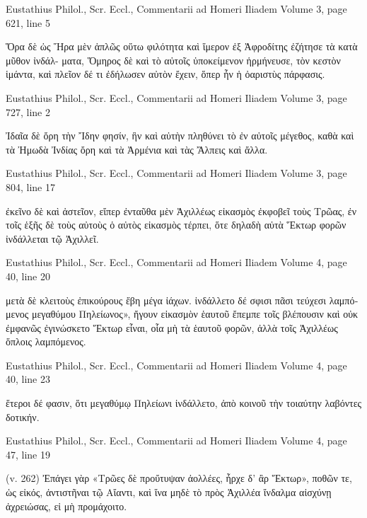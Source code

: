 \documentclass[12pt,letterpaper,twoside,final]{memoir}
\begin{document}
\begin{greek}
Eustathius Philol., Scr. Eccl., Commentarii ad Homeri Iliadem 
Volume 3, page 621, line 5

                                                            Ὅρα δὲ ὡς Ἥρα μὲν 
ἁπλῶς οὕτω φιλότητα καὶ ἵμερον ἐξ Ἀφροδίτης ἐζήτησε τὰ κατὰ μῦθον ἰνδάλ-
ματα, Ὅμηρος δὲ καὶ τὸ αὐτοῖς ὑποκείμενον ἡρμήνευσε, τὸν κεστὸν ἱμάντα, 
καὶ πλεῖον δέ τι ἐδήλωσεν αὐτὸν ἔχειν, ὅπερ ἦν ἡ ὀαριστὺς πάρφασις. 



Eustathius Philol., Scr. Eccl., Commentarii ad Homeri Iliadem 
Volume 3, page 727, line 2

                                                                               Ἰδαῖα δὲ   
ὄρη τὴν Ἴδην φησίν, ἣν καὶ αὐτὴν πληθύνει τὸ ἐν αὐτοῖς μέγεθος, καθὰ 
καὶ τὰ Ἠμωδὰ Ἰνδίας ὄρη καὶ τὰ Ἀρμένια καὶ τὰς Ἄλπεις καὶ ἄλλα. 



Eustathius Philol., Scr. Eccl., Commentarii ad Homeri Iliadem 
Volume 3, page 804, line 17

               ἐκεῖνο δὲ καὶ ἀστεῖον, εἴπερ ἐνταῦθα μὲν Ἀχιλλέως εἰκασμὸς 
ἐκφοβεῖ τοὺς Τρῶας, ἐν τοῖς ἑξῆς δὲ τοὺς αὐτοὺς ὁ αὐτὸς εἰκασμὸς τέρπει, 
ὅτε δηλαδὴ αὐτὰ Ἕκτωρ φορῶν ἰνδάλλεται τῷ Ἀχιλλεῖ. 



Eustathius Philol., Scr. Eccl., Commentarii ad Homeri Iliadem 
Volume 4, page 40, line 20

                                      μετὰ δὲ κλειτοὺς ἐπικούρους ἔβη μέγα ἰάχων. 
ἰνδάλλετο δέ σφισι πᾶσι τεύχεσι λαμπόμενος μεγαθύμου Πηλείωνος», ἤγουν 
εἰκασμὸν ἑαυτοῦ ἔπεμπε τοῖς βλέπουσιν καὶ οὐκ ἐμφανῶς ἐγινώσκετο Ἕκτωρ 
εἶναι, οἷα μὴ τὰ ἑαυτοῦ φορῶν, ἀλλὰ τοῖς Ἀχιλλέως ὅπλοις λαμπόμενος. 



Eustathius Philol., Scr. Eccl., Commentarii ad Homeri Iliadem 
Volume 4, page 40, line 23

ἕτεροι δέ φασιν, ὅτι μεγαθύμῳ Πηλείωνι ἰνδάλλετο, ἀπὸ κοινοῦ τὴν τοιαύτην 
λαβόντες δοτικήν. 



Eustathius Philol., Scr. Eccl., Commentarii ad Homeri Iliadem 
Volume 4, page 47, line 19

                   (v. 262) Ἐπάγει γὰρ «Τρῶες δὲ προὔτυψαν ἀολλέες, ἦρχε δ' 
ἂρ Ἕκτωρ», ποθῶν τε, ὡς εἰκός, ἀντιστῆναι τῷ Αἴαντι, καὶ ἵνα μηδὲ τὸ πρὸς 
Ἀχιλλέα ἴνδαλμα αἰσχύνῃ ἀχρειώσας, εἰ μὴ προμάχοιτο. 




\end{greek}
\end{document}
